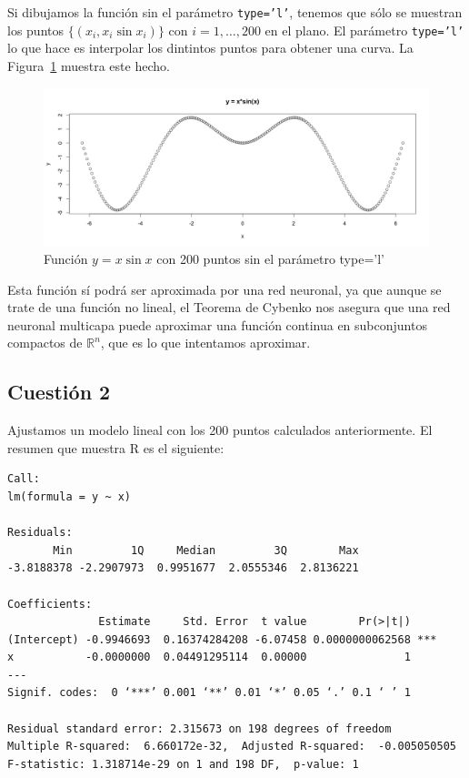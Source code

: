 \documentclass[12pt,a4paper,twoside,openright,titlepage,final]{article}
\begin{document}
Si dibujamos la función sin el parámetro \texttt{type='l'}, tenemos que sólo se muestran los puntos $\{(x_i, x_i \sin x_i)\}$  con $i = 1,\dots, 200$ en el plano. El parámetro \texttt{type='l'} lo que hace es interpolar los dintintos puntos para obtener una curva. La Figura~\ref{fig:funcion_sin_type} muestra este hecho.\\

\begin{figure}[tbph!]
\centering
\includegraphics[width=0.8\linewidth]{imagenes/funcion_sin_type}
\caption{Función $y = x\sin x$ con 200 puntos sin el parámetro type='l'}
\label{fig:funcion_sin_type}
\end{figure}

Esta función sí podrá ser aproximada por una red neuronal, ya que aunque se trate de una función no lineal, el Teorema de Cybenko nos asegura que una red neuronal multicapa puede aproximar una función continua en subconjuntos compactos de $\mathbb{R}^n$, que es lo que intentamos aproximar.

\subsection{Cuestión 2}

Ajustamos un modelo lineal con los 200 puntos calculados anteriormente. El resumen que muestra R es el siguiente:

\begin{verbatim}
Call:
lm(formula = y ~ x)

Residuals:
       Min         1Q     Median         3Q        Max 
-3.8188378 -2.2907973  0.9951677  2.0555346  2.8136221 

Coefficients:
              Estimate     Std. Error  t value        Pr(>|t|)    
(Intercept) -0.9946693  0.16374284208 -6.07458 0.0000000062568 ***
x           -0.0000000  0.04491295114  0.00000               1    
---
Signif. codes:  0 ‘***’ 0.001 ‘**’ 0.01 ‘*’ 0.05 ‘.’ 0.1 ‘ ’ 1

Residual standard error: 2.315673 on 198 degrees of freedom
Multiple R-squared:  6.660172e-32,	Adjusted R-squared:  -0.005050505 
F-statistic: 1.318714e-29 on 1 and 198 DF,  p-value: 1
\end{verbatim}
\end{document}
